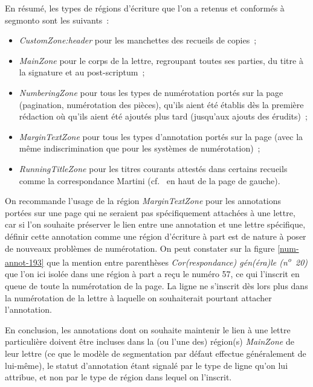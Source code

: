 \documentclass[a4paper,12pt,twoside]{book}
\begin{document}
				En résumé, les types de régions d'écriture que l'on a retenus et conformés à \gls{segmonto} sont les suivants~:
				
				\begin{itemize}
					\item \textit{CustomZone:header} pour les manchettes des recueils de copies~;
					\item \textit{MainZone} pour le corps de la lettre, regroupant toutes ses parties, du titre à la signature et au post-scriptum~;
					\item \textit{NumberingZone} pour tous les types de numérotation portés sur la page (pagination, numérotation des pièces), qu'ils aient été établis dès la première rédaction où qu'ils aient été ajoutés plus tard (jusqu'aux ajouts des érudits)~;
					\item \textit{MarginTextZone} pour tous les types d'annotation portés sur la page (avec la même indiscrimination que pour les systèmes de numérotation)~;
					\item \textit{RunningTitleZone} pour les titres courants attestés dans certains recueils comme la correspondance Martini (cf.~\cite{CdS19054056} en haut de la page de gauche).
				\end{itemize}
				
				On recommande l'usage de la région \textit{MarginTextZone} pour les annotations portées sur une page qui ne seraient pas spécifiquement attachées à une lettre, car si l'on souhaite préserver le lien entre une annotation et une lettre spécifique, définir cette annotation comme une région d'écriture à part est de nature à poser de nouveaux problèmes de numérotation. On peut constater sur la figure \ref{num-annot-193} que la mention entre parenthèses \textit{Cor(respondance) gén(éra)le (n\textsuperscript{o}~20)} que l'on ici isolée dans une région à part a reçu le numéro 57, ce qui l'inscrit en queue de toute la numérotation de la page. La ligne ne s'inscrit dès lors plus dans la numérotation de la lettre à laquelle on souhaiterait pourtant attacher l'annotation.
				
				En conclusion, les annotations dont on souhaite maintenir le lien à une lettre particulière doivent être incluses dans la (ou l'une des) région(s) \textit{MainZone} de leur lettre (ce que le modèle de \gls{segmentation} par défaut effectue généralement de lui-même), le statut d'annotation étant signalé par le type de ligne qu'on lui attribue, et non par le type de région dans lequel on l'inscrit.
				
\end{document}
